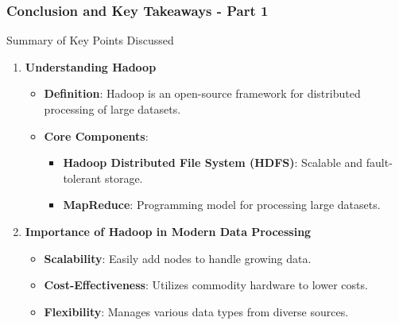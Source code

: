 \documentclass[aspectratio=169]{beamer}
\begin{document}
\begin{frame}[fragile]
    \frametitle{Conclusion and Key Takeaways - Part 1}
    \begin{block}{Summary of Key Points Discussed}
        \begin{enumerate}
            \item \textbf{Understanding Hadoop}
                \begin{itemize}
                    \item \textbf{Definition}: Hadoop is an open-source framework for distributed processing of large datasets.
                    \item \textbf{Core Components}:
                        \begin{itemize}
                            \item \textbf{Hadoop Distributed File System (HDFS)}: Scalable and fault-tolerant storage.
                            \item \textbf{MapReduce}: Programming model for processing large datasets.
                        \end{itemize}
                \end{itemize}
            \item \textbf{Importance of Hadoop in Modern Data Processing}
                \begin{itemize}
                    \item \textbf{Scalability}: Easily add nodes to handle growing data.
                    \item \textbf{Cost-Effectiveness}: Utilizes commodity hardware to lower costs.
                    \item \textbf{Flexibility}: Manages various data types from diverse sources.
                \end{itemize}
        \end{enumerate}
    \end{block}
\end{frame}
\end{document}
